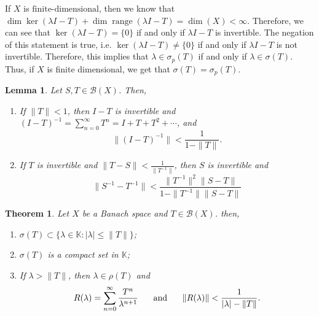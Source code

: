 \documentclass[12pt]{article}
\newtheorem{theorem}{Theorem}
\newtheorem{lemma}{Lemma}
\def\K{\mathbb{K}}
\newcommand{\B}{\mathscr{B}}
\newcommand{\fd}{{\text{finite-dimensional}}}
\DeclareMathOperator{\range}{range}
\newcommand{\sumo}{\sum\limits_{n = 0}^{\infty}}
\newcommand{\sbs}{\subset}
\begin{document}
\vspace{-15pt}
If $X$ is $\fd$, then we know that $\dim \ker(\lambda I - T) + \dim\range(\lambda I - T) = \dim(X) < \infty$. Therefore, we can see that $\ker(\lambda I - T) = \{ 0 \}$ if and only if $\lambda I - T$ is invertible. The negation of this statement is true, i.e. $\ker(\lambda I - T) \neq \{ 0 \}$ if and only if $\lambda I - T$ is not invertible. Therefore, this implies that $\lambda \in \sigma_p(T)$ if and only if $\lambda \in \sigma(T)$. Thus, if $X$ is finite dimensional, we get that $\sigma(T) = \sigma_p(T)$.
\begin{lemma}
Let $S, T \in \B(X)$. Then, 
\begin{enumerate}[topsep=-15pt]
\item[(a)] If $\| T \| < 1$, then $I - T$ is invertible and $(I  - T)^{-1} = \sumo T^n = I + T + T^2 + \cdots$, and 
\[ \| (I - T)^{-1} \| < \dfrac{1}{1 - \| T \|}.\]
\item[(b)] If $T$ is invertible and $\| T - S \| < \frac{1}{\| T^{-1} \|}$, then $S$ is invertible and 
\[ \| S^{-1} - T^{-1} \| < \dfrac{\| T^{-1} \|^2 \| S - T \| }{1 - \| T^{-1} \| \| S - T \|}\]
\end{enumerate}
\end{lemma}
\begin{theorem}
Let $X$ be a Banach space and $T \in \B(X)$. then, 
\begin{enumerate}[topsep=-15pt]
\item[(a)] $\sigma(T) \sbs \{ \lambda \in \K : |\lambda| \leq \| T \| \}$;
\item[(b)] $\sigma(T)$ is a compact set in $\K$;
\item[(c)] If $\lambda > \| T \|$, then $\lambda \in \rho(T)$ and 
\[ R(\lambda) = \sumo \frac{T^n}{\lambda^{n+1}} \hspace{5mm} \text{ and } \hspace{5mm} \| R(\lambda) \| < \frac{1}{|\lambda| - \| T \|}.\]
\end{enumerate}
\end{theorem}
\vspace{-15pt}
\end{document}
